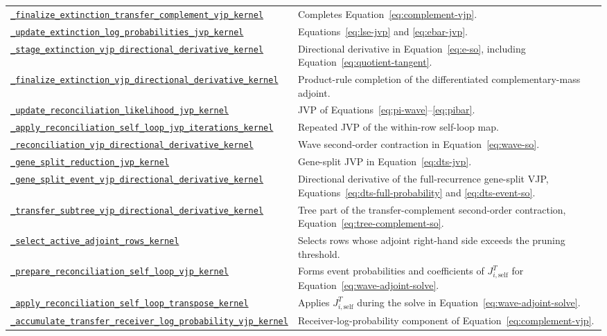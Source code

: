 \documentclass[11pt]{article}
\newcommand{\kernelref}[2]{\href{../../gpurec/core/kernels/#1}{\nolinkurl{#2}}}
\begin{document}
\begin{longtable}{>{\raggedright\arraybackslash}p{}
                  >{\raggedright\arraybackslash}p{}}
\kernelref{e_step.py}{_finalize_extinction_transfer_complement_vjp_kernel} & Completes Equation~\eqref{eq:complement-vjp}. \\
\kernelref{e_step_tangent.py}{_update_extinction_log_probabilities_jvp_kernel} & Equations~\eqref{eq:lse-jvp} and \eqref{eq:ebar-jvp}. \\
\kernelref{e_step_so.py}{_stage_extinction_vjp_directional_derivative_kernel} & Directional derivative in Equation~\eqref{eq:e-so}, including Equation~\eqref{eq:quotient-tangent}. \\
\kernelref{e_step_so.py}{_finalize_extinction_vjp_directional_derivative_kernel} & Product-rule completion of the differentiated complementary-mass adjoint. \\
\kernelref{wave_tangent.py}{_update_reconciliation_likelihood_jvp_kernel} & JVP of Equations~\eqref{eq:pi-wave}--\eqref{eq:pibar}. \\
\kernelref{wave_tangent.py}{_apply_reconciliation_self_loop_jvp_iterations_kernel} & Repeated JVP of the within-row self-loop map. \\
\kernelref{wave_so.py}{_reconciliation_vjp_directional_derivative_kernel} & Wave second-order contraction in Equation~\eqref{eq:wave-so}. \\
\kernelref{dts_tangent.py}{_gene_split_reduction_jvp_kernel} & Gene-split JVP in Equation~\eqref{eq:dts-jvp}. \\
\kernelref{dts_so.py}{_gene_split_event_vjp_directional_derivative_kernel} & Directional derivative of the full-recurrence gene-split VJP, Equations~\eqref{eq:dts-full-probability} and \eqref{eq:dts-event-so}. \\
\kernelref{dts_so.py}{_transfer_subtree_vjp_directional_derivative_kernel} & Tree part of the transfer-complement second-order contraction, Equation~\eqref{eq:tree-complement-so}. \\
\kernelref{wave_backward_kernels.py}{_select_active_adjoint_rows_kernel} & Selects rows whose adjoint right-hand side exceeds the pruning threshold. \\
\kernelref{wave_backward_kernels.py}{_prepare_reconciliation_self_loop_vjp_kernel} & Forms event probabilities and coefficients of $J_{i,\mathrm{self}}^T$ for Equation~\eqref{eq:wave-adjoint-solve}. \\
\kernelref{wave_backward_kernels.py}{_apply_reconciliation_self_loop_transpose_kernel} & Applies $J_{i,\mathrm{self}}^T$ during the solve in Equation~\eqref{eq:wave-adjoint-solve}. \\
\kernelref{wave_backward_kernels.py}{_accumulate_transfer_receiver_log_probability_vjp_kernel} & Receiver-log-probability component of Equation~\eqref{eq:complement-vjp}. \\

\end{longtable}
\end{document}
